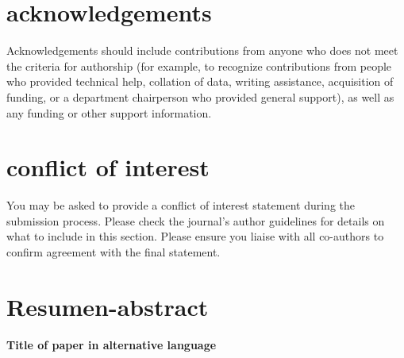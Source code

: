\documentclass[alpha-refs,serif]{ecotropicos-article}
\begin{document}
\begin{multicols}{2}
\section*{acknowledgements}
Acknowledgements should include contributions from anyone who does not meet the criteria for authorship (for example, to recognize contributions from people who provided technical help, collation of data, writing assistance, acquisition of funding, or a department chairperson who provided general support), as well as any funding or other support information.

\section*{conflict of interest}
You may be asked to provide a conflict of interest statement during the submission process. Please check the journal's author guidelines for details on what to include in this section. Please ensure you liaise with all co-authors to confirm agreement with the final statement.

\section*{Resumen-abstract}

\textbf{\Large{Title of paper in alternative language}}







\end{multicols}


\end{document}
